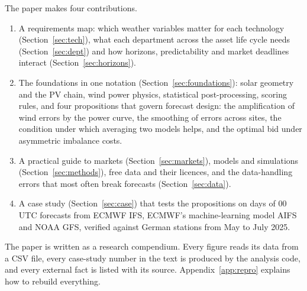 The paper makes four contributions.
\begin{enumerate}
\item A requirements map: which weather variables matter for each technology (Section~\ref{sec:tech}), what each department across the asset life cycle needs (Section~\ref{sec:dept}) and how horizons, predictability and market deadlines interact (Section~\ref{sec:horizons}).
\item The foundations in one notation (Section~\ref{sec:foundations}): solar geometry and the PV chain, wind power physics, statistical post-processing, scoring rules, and four propositions that govern forecast design: the amplification of wind errors by the power curve, the smoothing of errors across sites, the condition under which averaging two models helps, and the optimal bid under asymmetric imbalance costs.
\item A practical guide to markets (Section~\ref{sec:markets}), models and simulations (Section~\ref{sec:methods}), free data and their licences, and the data-handling errors that most often break forecasts (Section~\ref{sec:data}).
\item A case study (Section~\ref{sec:case}) that tests the propositions on \valNumRuns{} days of 00\,UTC forecasts from ECMWF IFS, ECMWF's machine-learning model AIFS and NOAA GFS, verified against \valNumStations{} German stations from May to July 2025.
\end{enumerate}

The paper is written as a research compendium. Every figure reads its data from a CSV file, every case-study number in the text is produced by the analysis code, and every external fact is listed with its source. Appendix~\ref{app:repro} explains how to rebuild everything.
